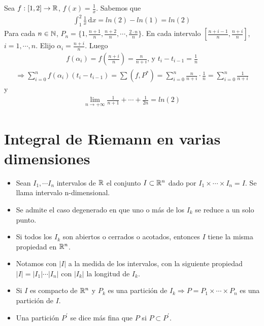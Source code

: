 \clearpage

\begin{eg}
  Sea $f: [1, 2] \to \mathbb{R}$, $f(x) = \frac{1}{x}$. Sabemos que \begin{align*}\int_1^2 \frac{1}{x} \, \mathrm{d}x = ln(2) - ln(1) = ln(2)\end{align*} Para cada $n \in \mathbb{N}$, $P_n = \{1, \frac{n+1}{n}, \frac{n+2}{n}, \cdots, \frac{2 \cdot n}{n}\}$. En cada intervalo $[\frac{n+i-1}{n}, \frac{n+i}{n}]$, $i = 1, \cdots, n$. Elijo $\alpha_i = \frac{n+i}{n}$. Luego
  \begin{align*}
    f(\alpha_i) = f(\frac{n+i}{n}) = \frac{n}{n+i} \text{, y } t_i - t_{i-1} = \frac{1}{n}
  \end{align*}
  \begin{align*}
    \Rightarrow \sum_{i = 0}^n f(\alpha_i) (t_i - t_{i-1}) = \sum(f, P^*) = \sum_{i = 0}^n \frac{n}{n+i} \cdot \frac{1}{n} = \sum_{i = 0}^n \frac{1}{n+i}
  \end{align*} y
  \begin{align*}
    \lim_{n \to +\infty} \frac{1}{n+1} + \cdots + \frac{1}{2n} = ln(2)
  \end{align*}
\end{eg}

\section{Integral de Riemann en varias dimensiones}

\begin{itemize}
  \item Sean $I_1, \cdots I_n$ intervalos de $\mathbb{R}$ el conjunto $I \subset \mathbb{R}^n$ dado por $I_1 \times \cdots \times I_n = I$. Se llama intervalo n-dimensional.
  \item Se admite el caso degenerado en que uno o más de los $I_k$ se reduce a un solo punto.
  \item Si todos los $I_k$ son abiertos o cerrados o acotados, entonces $I$ tiene la misma propiedad en $\mathbb{R}^n$.
  \item Notamos con $|I|$ a la medida de los intervalos, con la siguiente propiedad $|I| = |I_1| \cdots |I_n|$ con $|I_k|$ la longitud de $I_k$.
  \item Si $I$ es compacto de $\mathbb{R}^n$ y $P_k$ es una partición de $I_k \Rightarrow P = P_1 \times \cdots \times P_n$ es una partición de $I$.
  \item Una partición $P^{\prime}$ se dice más fina que $P$ si $P \subset P^{\prime}$.
\end{itemize}

